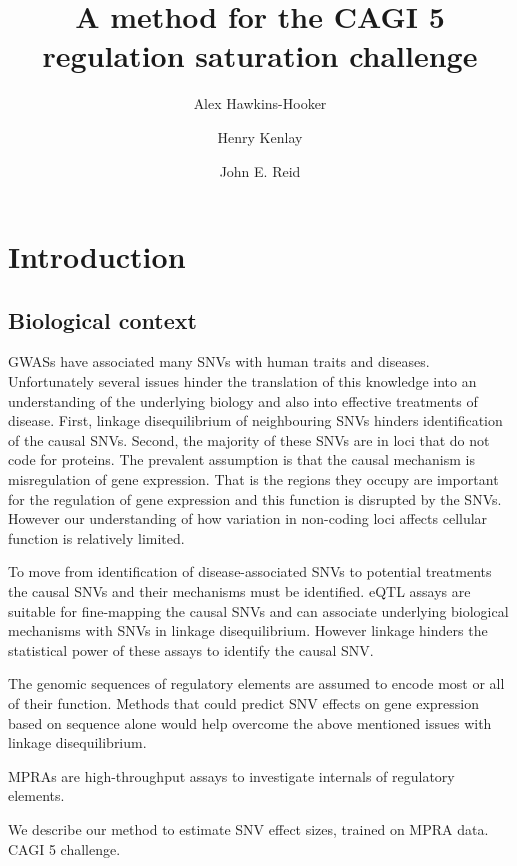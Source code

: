 \documentclass{article}
\author[1]{Alex Hawkins-Hooker}
\author[1]{Henry Kenlay}
\author[1, 2]{John E. Reid}
\affil[1]{\footnotesize MRC Biostatistics Unit, University of Cambridge, Cambridge, UK}
\affil[2]{\footnotesize Alan Turing Institute, British Library, London, UK}
\title{A method for the CAGI 5 regulation saturation challenge}
\begin{document}
\maketitle




\section*{Introduction}

\subsection*{Biological context}

\acp{GWAS} have associated many \acp{SNV} with human traits and diseases.
Unfortunately several issues hinder the translation of this knowledge into an
understanding of the underlying biology and also into effective treatments of
disease.  First, linkage disequilibrium of neighbouring \acp{SNV} hinders
identification of the causal \acp{SNV}. Second, the majority of these \acp{SNV}
are in loci that do not code for proteins. The prevalent assumption is that the
causal mechanism is misregulation of gene expression. That is the regions they
occupy are important for the regulation of gene expression and this function is
disrupted by the \acp{SNV}.  However our understanding of how variation in
non-coding loci affects cellular function is relatively limited. 

To move from identification of disease-associated \acp{SNV} to potential
treatments the causal \acp{SNV} and their mechanisms must be identified.
\ac{eQTL} assays are suitable for fine-mapping the causal \acp{SNV} and can
associate underlying biological mechanisms with \acp{SNV} in linkage
disequilibrium.  However linkage hinders the statistical power of these assays
to identify the causal \ac{SNV}.

The genomic sequences of regulatory elements are assumed to encode most or all
of their function.  Methods that could predict \ac{SNV} effects on gene
expression based on sequence alone would help overcome the above mentioned
issues with linkage disequilibrium.

\acp{MPRA} are high-throughput assays to investigate internals of regulatory
elements.  

We describe our method to estimate \ac{SNV} effect sizes, trained on \ac{MPRA} data.
\ac{CAGI} 5 challenge.
\end{document}
